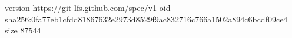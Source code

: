version https://git-lfs.github.com/spec/v1
oid sha256:0fa77eb1cfdd81867632e2973d8529f9ac832716c766a1502a894c6bcdf09ce4
size 87544
